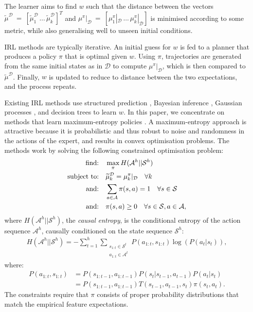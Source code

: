 \documentclass[letterpaper]{article}
\begin{document}
The learner aims to find $w$ such that the distance between the vectors $\widetilde\mu^{\mathcal{D}}~=~[\widetilde\mu^{\mathcal{D}}_1\,\ldots\,\widetilde\mu^{\mathcal{D}}_k]^T$ and $\mu^{\pi}|_{\mathcal{D}}~=~[\mu^{\pi}_1|_{\mathcal{D}}\,\ldots\,\mu^{\pi}_k|_{\mathcal{D}}]$ is minimised according to some metric, while also generalising well to unseen initial conditions.

IRL methods are typically iterative. An initial guess for $w$ is fed to a planner that produces a policy $\pi$ that is optimal given $w$.  Using $\pi$, trajectories are generated from the same initial states as in $\mathcal{D}$ to compute $\mu^{\pi}|_{\mathcal{D}}$, which is then compared to $\widetilde{\mu}^{\mathcal{D}}$.  Finally, $w$ is updated to reduce to distance between the two expectations, and the process repeats.

Existing IRL methods use structured prediction \cite{ratliff2006maximum}, Bayesian inference \cite{ramachandran2007bayesian,dimitrakakis2012bayesian}, Gaussian processes \cite{levine2011nonlinear}, and decision trees \cite{ratliff2007boosting} to learn $w$.  In this paper, we concentrate on methods that learn maximum-entropy policies \cite{ziebart2008maximum,ziebart2010modelingthesis}.  A maximum-entropy approach is attractive because it is probabilistic and thus robust to noise and randomness in the actions of the expert, and results in convex optimisation problems. The methods work by solving the following constrained optimisation problem:
\begin{align}
	\hbox{find:} &\quad\max\limits_{\pi} H(\mathcal{A}^h||\mathcal{S}^h)\label{eq:primal_obj}\\
\hbox{subject to:}&\quad\widetilde{\mu}^{\mathcal{D}}_k   = \mu^{\pi}_k|_{\mathcal{D}}\quad\forall k \label{eq:features_equality_constraint}\\
\hbox{and:} &\quad\sum_{a\in\mathcal{A}}\pi(s,a)  = 1\quad\forall s\in\mathcal{S}\\
\hbox{and:} &\quad\pi(s,a) \geq 0\quad\forall s\in\mathcal{S},a\in\mathcal{A},\label{eq:positive_policy}
\end{align}
where $H(\mathcal{A}^h||\mathcal{S}^h)$, the \emph{causal entropy}, is the conditional entropy of the action sequence $\mathcal{A}^h$, causally conditioned on the state sequence $\mathcal{S}^h$:
\begin{align}
H(\mathcal{A}^h||\mathcal{S}^h) = -\sum_{t=1}^h \sum_{\substack{s_{1:t}\in\mathcal{S}^t\\a_{1:t}\in\mathcal{A}^t}} P(a_{1:t},s_{1:t})\log(P(a_t|s_t)),
\label{eg:entdef}
\end{align}
where:
\begin{align*}
  P(a_{1:t},s_{1:t})&= P(s_{1:t-1},a_{1:t-1})P(s_t|s_{t-1},a_{t-1})P(a_t|s_t)\\
  &=P(s_{1:t-1},a_{1:t-1})T(s_{t-1},a_{t-1},s_t)\pi(s_t,a_t).
\end{align*}
The constraints require that $\pi$ consists of proper probability distributions that match the empirical feature expectations.
\end{document}
